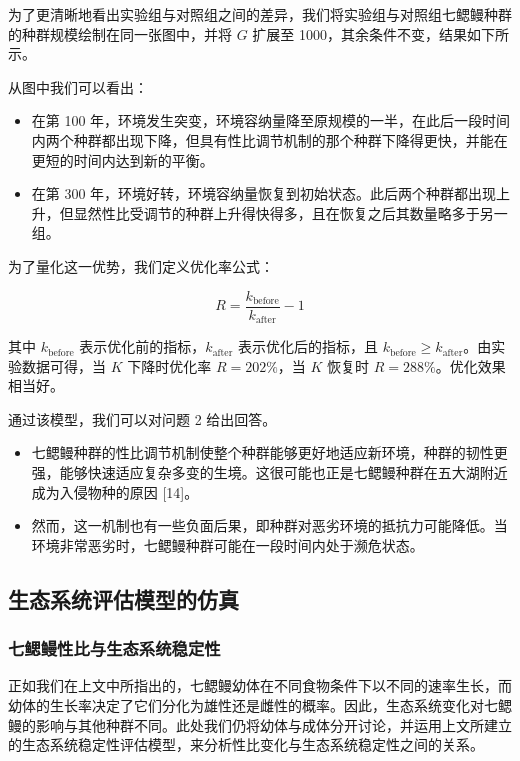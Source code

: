 \documentclass[11pt,a4paper]{ctexart}
\begin{document}
为了更清晰地看出实验组与对照组之间的差异，我们将实验组与对照组七鳃鳗种群的种群规模绘制在同一张图中，并将 $G$ 扩展至 1000，其余条件不变，结果如下所示。

从图中我们可以看出：

\begin{itemize}
\item 在第 100 年，环境发生突变，环境容纳量降至原规模的一半，在此后一段时间内两个种群都出现下降，但具有性比调节机制的那个种群下降得更快，并能在更短的时间内达到新的平衡。
\item 在第 300 年，环境好转，环境容纳量恢复到初始状态。此后两个种群都出现上升，但显然性比受调节的种群上升得快得多，且在恢复之后其数量略多于另一组。
\end{itemize}

为了量化这一优势，我们定义优化率公式：

\begin{equation}
R=\frac{k_{\mathrm{before}}}{k_{\mathrm{after}}}-1
\end{equation}

其中 $k_{\mathrm{before}}$ 表示优化前的指标，$k_{\mathrm{after}}$ 表示优化后的指标，且 $k_{\mathrm{before}}\ge k_{\mathrm{after}}$。由实验数据可得，当 $K$ 下降时优化率 $R=202\%$，当 $K$ 恢复时 $R=288\%$。优化效果相当好。

通过该模型，我们可以对问题 2 给出回答。

\begin{itemize}
\item 七鳃鳗种群的性比调节机制使整个种群能够更好地适应新环境，种群的韧性更强，能够快速适应复杂多变的生境。这很可能也正是七鳃鳗种群在五大湖附近成为入侵物种的原因 [14]。
\item 然而，这一机制也有一些负面后果，即种群对恶劣环境的抵抗力可能降低。当环境非常恶劣时，七鳃鳗种群可能在一段时间内处于濒危状态。
\end{itemize}

\subsection{生态系统评估模型的仿真}

\subsubsection{七鳃鳗性比与生态系统稳定性}

正如我们在上文中所指出的，七鳃鳗幼体在不同食物条件下以不同的速率生长，而幼体的生长率决定了它们分化为雄性还是雌性的概率。因此，生态系统变化对七鳃鳗的影响与其他种群不同。此处我们仍将幼体与成体分开讨论，并运用上文所建立的生态系统稳定性评估模型，来分析性比变化与生态系统稳定性之间的关系。
\end{document}
